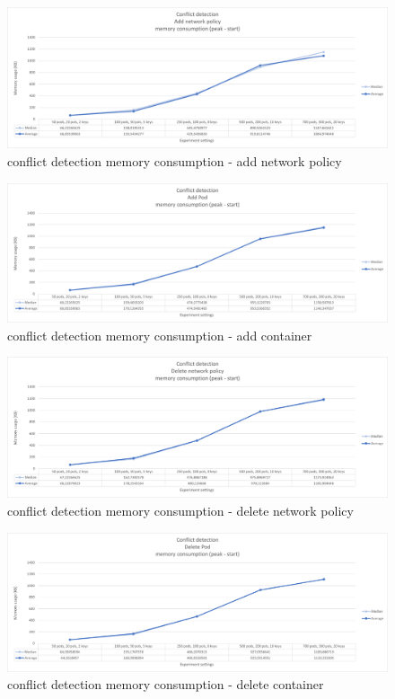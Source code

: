 \begin{figure}[H]
    \centering
    \includegraphics[width=\textwidth]{images/experiment2/addNP-memory-conflict.png}
    \caption{conflict detection memory consumption - add network policy}
    \label{fig:exp2-addNP-memory-conflict}
\end{figure}
\begin{figure}[H]
    \centering
    \includegraphics[width=\textwidth]{images/experiment2/addPod-memory-conflict.png}
    \caption{conflict detection memory consumption - add container}
    \label{fig:exp2-addPod-memory-conflict}
\end{figure}
\begin{figure}[H]
    \centering
    \includegraphics[width=\textwidth]{images/experiment2/delNP-memory-conflict.png}
    \caption{conflict detection memory consumption - delete network policy}
    \label{fig:exp2-delNP-memory-conflict}
\end{figure}
\begin{figure}[H]
    \centering
    \includegraphics[width=\textwidth]{images/experiment2/delPod-memory-conflict.png}
    \caption{conflict detection memory consumption - delete container}
    \label{fig:exp2-delPod-memory-conflict}
\end{figure}


